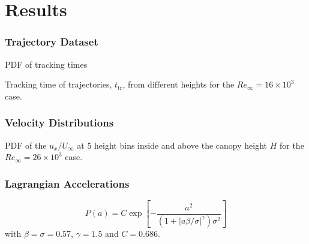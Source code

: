 \documentclass[aspectratio=43]{beamer}
\begin{document}
\section{Results}\label{sec:results}
\subsubsection*{Trajectory Dataset}
%
\begin{frame}[label=result-5]
	\centering
\end{frame}


\begin{frame}[label=result-4]{PDF of tracking times}
\centering {}
\begin{cardTiny} Tracking time of trajectories, $t_\text{tr}$, from different heights for the  $Re_\infty=16\times10^3$ case. \end{cardTiny} 
\end{frame}


\subsubsection*{Velocity Distributions}
\begin{frame}[label=result-1]
	\centering
	\vspace{-.3cm}
	\begin{cardTiny} PDF of the $u_x/U_\infty$ at 5 height bins inside and above the canopy height $H$ for the $Re_\infty = 26\times 10^3$ case. 
	\end{cardTiny}
\end{frame}


\subsubsection*{Lagrangian Accelerations}

\begin{frame}[label=result-2]
\centering{}
\begin{cardTiny} %
\begin{equation}
P(a) = C \exp \left[- \frac{a^2}{\left( 1 + |a\beta / \sigma|^\gamma   \right) \sigma^2} \right]
\label{eq:stretched_exp}
\end{equation}
with $\beta=\sigma=0.57$, $\gamma=1.5$ and $C = 0.686$. 
\end{cardTiny}
\end{frame}
\end{document}
